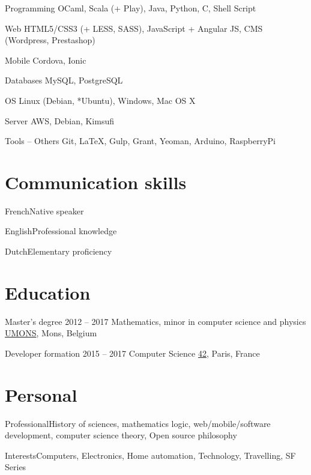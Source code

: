\documentclass[fontsize=10pt]{tccv}
\begin{document}
\begin{factlist}

\item{Programming}
     {OCaml, Scala (+ Play), Java, Python, C, Shell Script}

\item{Web}
	{HTML5/CSS3 (+ LESS, SASS), JavaScript + Angular JS, CMS (Wordpress,
	Prestashop)}

\item{Mobile}
	{Cordova, Ionic}
\item{Databases}
     {MySQL, PostgreSQL}

\item{OS}
     {Linux (Debian, *Ubuntu), Windows, Mac OS X}

\item{Server}
     {AWS, Debian, Kimsufi}

\item{Tools -- Others}
     {Git, LaTeX, Gulp, Grant, Yeoman, Arduino, RaspberryPi}
\end{factlist}

\section{Communication skills}

\begin{factlist}
\item{French}{Native speaker}
\item{English}{Professional knowledge}
\item{Dutch}{Elementary proficiency}
\end{factlist}

\section{Education}

\begin{yearlist}

\item[Master's degree]{2012 -- 2017}
     {Mathematics, minor in computer science and physics}
     {\href{http://umons.ac.be}{UMONS}, Mons, Belgium}

\item[Developer formation]{2015 -- 2017}
	 {Computer Science}
	 {\href{http://42.fr}{42}, Paris, France}

\end{yearlist}


\section{Personal}
\begin{factlist}
\item{Professional}{History of sciences,
	mathematics logic, web/mobile/software development, computer science theory,
Open source philosophy}
\item{Interests}{Computers, Electronics, Home automation, Technology,
	Travelling, SF Series}
\end{factlist}
\end{document}
